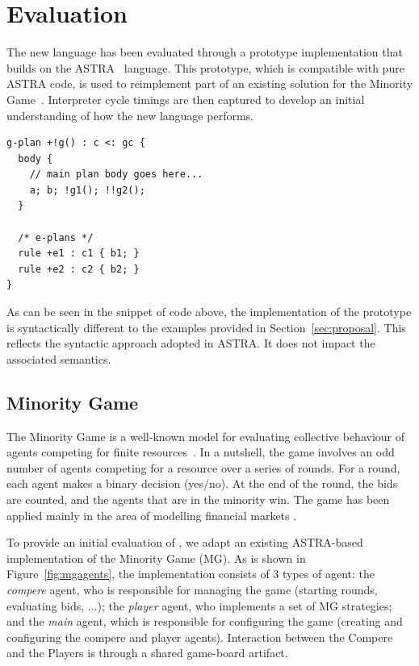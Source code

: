 \section{Evaluation}
\label{sec:evaluation}
The new language has been evaluated through a prototype implementation that builds on 
the ASTRA~\cite{DBLP:conf/prima/CollierRL15} language. This prototype, which is compatible
with pure ASTRA code, is used to reimplement part of an existing solution for the Minority 
Game~\cite{moro2004minority}. Interpreter cycle timings are then captured to develop an initial
understanding of how the new language performs.

{\small
\begin{verbatim}
g-plan +!g() : c <: gc { 
  body {
    // main plan body goes here...
    a; b; !g1(); !!g2();
  }

  /* e-plans */
  rule +e1 : c1 { b1; }
  rule +e2 : c2 { b2; }
}
\end{verbatim}}

As can be seen in the  snippet of code above, the implementation of the {\aser} prototype is 
syntactically different to the examples provided in Section~\ref{sec:proposal}. This reflects 
the syntactic approach adopted in ASTRA. It does not impact the associated semantics.

\subsection{Minority Game}
\label{minority}
The Minority Game is a well-known model for evaluating collective behaviour of agents competing 
for finite resources~\cite{moro2004minority}. In a nutshell, the game involves an odd number of
agents competing for a resource over a series of rounds. For a round, each agent makes a binary
decision (yes/no). At the end of the round, the bids are counted, and the agents that are in the
minority win. The game has been applied mainly in the area of modelling financial markets \cite{??}.

To provide an initial evaluation of {\aser}, we adapt an existing ASTRA-based implementation of 
the Minority Game (MG). As is shown in Figure~\ref{fig:mgagents}, the implementation consists of
3 types of agent: the \emph{compere} agent, who is responsible for managing the game (starting 
rounds, evaluating bids, ...); the \emph{player} agent, who implements a set of MG strategies; 
and the \emph{main} agent, which is responsible for configuring the game (creating and configuring
the compere and player agents). Interaction between the Compere and the Players is through a shared 
game-board artifact.

